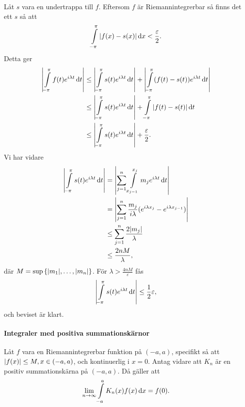 \proof
Låt $s$ vara en undertrappa till $f$. Eftersom $f$ är Riemannintegrerbar så finns det ett $s$ så att
\begin{align*}
	\int\limits_{-\pi}^{\pi}\abs{f(x) - s(x)}\dd{x} < \frac{\varepsilon}{2}.
\end{align*}
Detta ger
\begin{align*}
	\abs{\int\limits_{-\pi}^{\pi}f(t)e^{i\lambda t}\dd{t}} &\leq \abs{\int\limits_{-\pi}^{\pi}s(t)e^{i\lambda t}\dd{t}} + \abs{\int\limits_{-\pi}^{\pi}(f(t) - s(t))e^{i\lambda t}\dd{t}} \\
	                                                 &\leq \abs{\int\limits_{-\pi}^{\pi}s(t)e^{i\lambda t}\dd{t}} + \int\limits_{-\pi}^{\pi}\abs{f(t) - s(t)}\dd{t} \\
	                                                 &\leq \abs{\int\limits_{-\pi}^{\pi}s(t)e^{i\lambda t}\dd{t}} + \frac{\varepsilon}{2}.
\end{align*}
Vi har vidare
\begin{align*}
	\abs{\int\limits_{-\pi}^{\pi}s(t)e^{i\lambda t}\dd{t}} &= \abs{\sum\limits_{j = 1}^{n}\int\limits_{x_{j - 1}}^{x_{j}}m_{j}e^{i\lambda t}\dd{t}} \\
	                                                 &= \abs{\sum\limits_{j = 1}^{n}\frac{m_{j}}{i\lambda}(e^{i\lambda x_{j}} - e^{i\lambda x_{j - 1}})} \\
	                                                 &\leq \sum\limits_{j = 1}^{n}\frac{2\abs{m_{j}}}{\lambda} \\
	                                                 &\leq \frac{2nM}{\lambda},
\end{align*}
där $M = \sup{\{\abs{m_{1}}, \dots, \abs{m_{n}}\}}$. För $\lambda > \frac{4nM}{\varepsilon}$ fås
\begin{align*}
	\abs{\int\limits_{-\pi}^{\pi}s(t)e^{i\lambda t}\dd{t}} \leq \frac{1}{2}\varepsilon,
\end{align*}
och beviset är klart.

\paragraph{Integraler med positiva summationskärnor}
Låt $f$ vara en Riemannintegrerbar funktion på $(-a, a)$, specifikt så att $\abs{f(x)}\leq M, x\in (-a, a)$, och kontinuerlig i $x = 0$. Antag vidare att $K_{n}$ är en positiv summationskärna på $(-a, a)$. Då gäller att
\begin{align*}
	\lim\limits_{n\to\infty}\int\limits_{-a}^{a}K_{n}(x)f(x)\dd{x} = f(0).
\end{align*}

